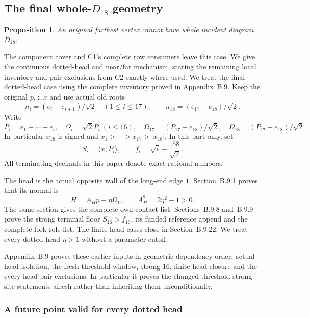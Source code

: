 \documentclass[11pt]{article}
\newtheorem{proposition}[theorem]{Proposition}
\theoremstyle{remark}\newtheorem{remark}[theorem]{Remark}
\numberwithin{equation}{section}
\newcommand{\ip}[2]{\langle #1,#2\rangle}
\begin{document}
\subsection[The final whole-D18 geometry]{The final whole-$D_{18}$ geometry}
\label{compact:sec:d18-setup}
\begin{proposition}\label{prop:d18}
An original farthest vertex cannot have whole incident diagram $D_{18}$.
\end{proposition}
The component cover and C1's complete row consumers leave this case.
We give the continuous dotted-head and near/far mechanism, stating the
remaining local inventory and pair exclusions from C2 exactly where used.
We treat the final dotted-head case using the complete inventory
proved in Appendix~B.9.
Keep the original \(p,z,x\) and use actual old roots
 \[
 n_i=(e_i-e_{i+1})/\sqrt2\quad(1\leq i\leq17),\qquad
 n_{18}=(e_{17}+e_{18})/\sqrt2.
\]
Write
 \[
 P_i=e_1+\cdots+e_i,\quad
 \Omega_i=\sqrt2P_i\ (i\leq16),\quad
 \Omega_{17}=(P_{17}-e_{18})/\sqrt2,\quad
 \Omega_{18}=(P_{17}+e_{18})/\sqrt2.
\]
In particular \(x_{18}\) is signed and
 \(x_1>\cdots>x_{17}>|x_{18}|\). In this part only, set
 \begin{equation}
\label{compact:eq:d18floors}
 S_i=\ip{x}{P_i},\qquad f_i=\sqrt i-\frac{.58}{\sqrt2}.
\end{equation}
All terminating decimals in this paper denote exact rational numbers.

The head is the actual opposite wall of the long-end edge \(1\).
Section~B.9.1 proves that its normal is
 \[
 H=A_Hp-\eta\Omega_1,\qquad A_H^2=2\eta^2-1>0.
\]
The same section gives the complete own-contact list.
Sections~B.9.8 and~B.9.9 prove
the strong terminal floor \(S_{16}>f_{16}\), its funded reference
append and the complete fork-role list. The finite-head cases close
in Section~B.9.22.
We treat every dotted head \(\eta>1\) without a parameter cutoff.

Appendix~B.9 proves these earlier inputs in
geometric dependency order: actual head isolation, the fresh threshold
window, strong \(16\), finite-head closure and the every-head pair
exclusions. In particular it proves the changed-threshold strong-site
statements afresh rather than inheriting them unconditionally.

\subsubsection{A future point valid for every dotted head}
\end{document}
